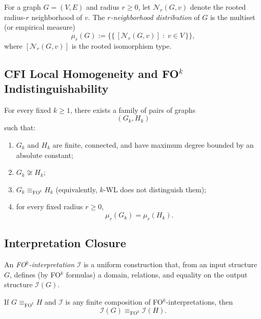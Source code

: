 \begin{definition}
For a graph $G=(V,E)$ and radius $r\ge 0$, let $\mathcal{N}_r(G,v)$ denote the rooted radius-$r$
neighborhood of $v$. The \emph{$r$-neighborhood distribution} of $G$ is the multiset (or empirical measure)
\[
\mu_r(G) := \big\{\!\big\{\, [\mathcal{N}_r(G,v)] \;:\; v\in V \,\big\}\!\big\},
\]
where $[\mathcal{N}_r(G,v)]$ is the rooted isomorphism type.
\end{definition}

\subsection{CFI Local Homogeneity and FO$^k$ Indistinguishability}

\begin{theorem}
For every fixed $k\ge 1$, there exists a family of pairs of graphs
\[
(G_k,H_k)
\]
such that:
\begin{enumerate}
\item $G_k$ and $H_k$ are finite, connected, and have maximum degree bounded by an absolute constant;
\item $G_k \not\cong H_k$;
\item $G_k \equiv_{\mathrm{FO}^k} H_k$ (equivalently, $k$-WL does not distinguish them);
\item for every fixed radius $r\ge 0$,
\[
\mu_r(G_k) = \mu_r(H_k).
\]
\end{enumerate}
\end{theorem}

\subsection{Interpretation Closure}

\begin{definition}[FO$^k$-interpretation]
An \emph{FO$^k$-interpretation} $\mathcal{I}$ is a uniform construction that, from an input structure $G$,
defines (by FO$^k$ formulas) a domain, relations, and equality on the output structure $\mathcal{I}(G)$.
\end{definition}

\begin{lemma}
If $G \equiv_{\mathrm{FO}^k} H$ and $\mathcal{I}$ is any finite composition of FO$^k$-interpretations, then
\[
\mathcal{I}(G) \equiv_{\mathrm{FO}^k} \mathcal{I}(H).
\]
\end{lemma}

